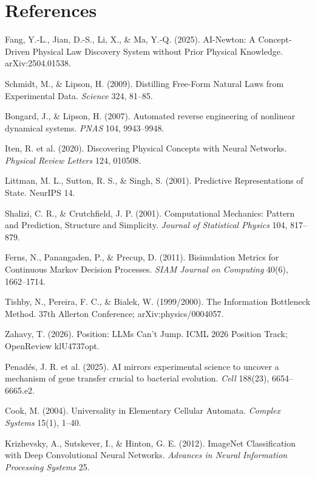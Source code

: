 \documentclass[11pt]{article}
\begin{document}
\section*{References}
\small
\begin{enumerate}[label={[\arabic*]},leftmargin=2.2em]
\item Fang, Y.-L., Jian, D.-S., Li, X., \& Ma, Y.-Q. (2025). AI-Newton: A Concept-Driven Physical Law Discovery System without Prior Physical Knowledge. arXiv:2504.01538.
\item Schmidt, M., \& Lipson, H. (2009). Distilling Free-Form Natural Laws from Experimental Data. \emph{Science} 324, 81--85.
\item Bongard, J., \& Lipson, H. (2007). Automated reverse engineering of nonlinear dynamical systems. \emph{PNAS} 104, 9943--9948.
\item Iten, R. et al. (2020). Discovering Physical Concepts with Neural Networks. \emph{Physical Review Letters} 124, 010508.
\item Littman, M. L., Sutton, R. S., \& Singh, S. (2001). Predictive Representations of State. NeurIPS 14.
\item Shalizi, C. R., \& Crutchfield, J. P. (2001). Computational Mechanics: Pattern and Prediction, Structure and Simplicity. \emph{Journal of Statistical Physics} 104, 817--879.
\item Ferns, N., Panangaden, P., \& Precup, D. (2011). Bisimulation Metrics for Continuous Markov Decision Processes. \emph{SIAM Journal on Computing} 40(6), 1662--1714.
\item Tishby, N., Pereira, F. C., \& Bialek, W. (1999/2000). The Information Bottleneck Method. 37th Allerton Conference; arXiv:physics/0004057.
\item Zahavy, T. (2026). Position: LLMs Can't Jump. ICML 2026 Position Track; OpenReview klU4737opt.
\item Penad\'es, J. R. et al. (2025). AI mirrors experimental science to uncover a mechanism of gene transfer crucial to bacterial evolution. \emph{Cell} 188(23), 6654--6665.e2.
\item Cook, M. (2004). Universality in Elementary Cellular Automata. \emph{Complex Systems} 15(1), 1--40.
\item Krizhevsky, A., Sutskever, I., \& Hinton, G. E. (2012). ImageNet Classification with Deep Convolutional Neural Networks. \emph{Advances in Neural Information Processing Systems} 25.
\end{enumerate}
\end{document}
